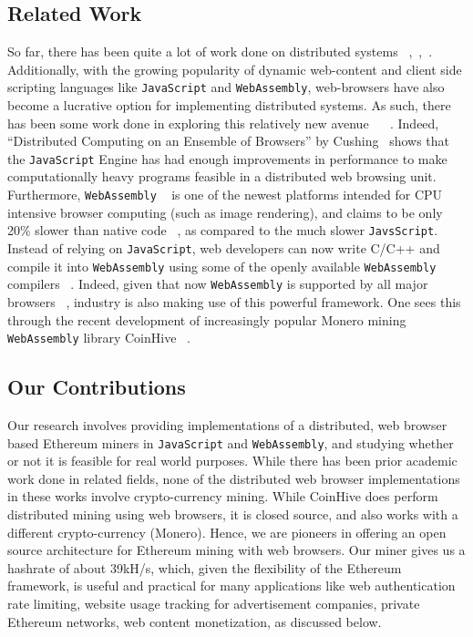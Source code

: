 \documentclass[runningheads]{llncs}
\begin{document}
\subsection{Related Work}
So far, there has been quite a lot of work done on distributed systems ~\cite{scheduling},~\cite{parallel},~\cite{orca}. Additionally, with the growing popularity of dynamic web-content and client side scripting languages like \verb|JavaScript| and \verb|WebAssembly|, web-browsers have also become a lucrative option for implementing distributed systems. As such, there has been some work done in exploring this relatively new avenue ~\cite{WebFlow} ~\cite{Duda}. 
Indeed, ``Distributed Computing on an Ensemble of Browsers'' by Cushing~\cite{Cushing} shows that the \verb|JavaScript| Engine has had enough improvements in performance to make computationally heavy programs feasible in a distributed web browsing unit. 
Furthermore, \verb|WebAssembly|  ~\cite{webAssembly} is one of the newest platforms intended for CPU intensive browser computing (such as image rendering), and claims to be only 20\% slower than native code ~\cite{wasmPerf}, as compared to the much slower \verb|JavsScript|. Instead of relying on \verb|JavaScript|, web developers can now write C/C++ and compile it into \verb|WebAssembly| using some of the openly available \verb|WebAssembly| compilers ~\cite{emscripten}. Indeed, given that now \verb|WebAssembly| is supported by all major browsers ~\cite{webAssembly}, industry is also making use of this powerful framework. One sees this through the recent development of increasingly popular Monero mining \verb|WebAssembly| library CoinHive ~\cite{coinhive}.

\subsection{Our Contributions}
Our research involves providing implementations of a distributed, web browser based Ethereum miners in \verb|JavaScript| and \verb|WebAssembly|, and studying whether or not it is feasible for real world purposes. While there has been prior academic work done in related fields, none of the distributed web browser implementations in these works involve crypto-currency mining. While CoinHive does perform distributed mining using web browsers, it is closed source, and also works with a different crypto-currency (Monero). Hence, we are pioneers in offering an open source architecture for Ethereum mining with web browsers. Our miner gives us a hashrate of about 39kH/s, which, given the flexibility of the Ethereum framework, is useful and practical for many applications like web authentication rate limiting, website usage tracking for advertisement companies, private Ethereum networks, web content monetization, as discussed below.
\end{document}
